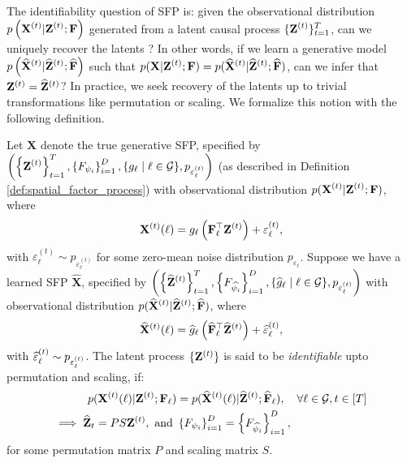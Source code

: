 The identifiability question of SFP is: given the observational distribution $\displaystyle p \left(\mathbf{X}^{(t)}|\mathbf{Z}^{(t)}; \mathbf{F}\right)$ generated from a latent causal process $\displaystyle \{ \mathbf{Z}^{(t)} \}_{t=1}^T$, can we uniquely recover the latents \citep{yao2021learning, yao2022temporally, moran2022identifiable}? In other words, if we learn a generative model $\displaystyle p\left( \widehat{\mathbf{X}}^{(t)} | \widehat{\mathbf{Z}}^{(t)};  \widehat{\mathbf{F}} \right)$ such that $\displaystyle p(\mathbf{X}|\mathbf{Z}^{(t)}; {\mathbf{F}}) = p(\widehat{\mathbf{X}}^{(t)}|\widehat{\mathbf{Z}}^{(t)}; \widehat{\mathbf{F}} )$, can we infer that $\mathbf{Z}^{(t)} = \widehat{\mathbf{Z}}^{(t)}$? In practice, we seek recovery of the latents up to trivial transformations like permutation or scaling.  We formalize this notion with the following definition.

\begin{definition}
  Let $\mathbf{X}$ denote the true generative SFP, specified by $\displaystyle \left(\left\{\mathbf{Z}^{(t)}\right\}_{t=1}^T, \left\{ F_{\psi_i} \right\}_{i=1}^D , \{ g_{\ell} \mid \ell \in \mathcal{G}\}, p_{\varepsilon_{\ell}^{(t)}} \right)$ (as described in Definition \ref{def:spatial_factor_process}) with observational distribution $\displaystyle p(\mathbf{X}^{(t)} | \mathbf{Z}^{(t)}; \mathbf{F})$, where 
  \begin{equation}
      \mathbf{X}^{(t)}(\ell) = g_{\ell} \left( \mathbf{F}_{\ell}^\top \mathbf{Z}^{(t)} \right) + \varepsilon_{\ell}^{(t)}, \label{eqn:xt1}
  \end{equation} 
  with $\varepsilon_{\ell}^{(t)} \sim p_{\varepsilon_{\ell}^{(t)}}$ for some zero-mean noise distribution $p_{\varepsilon_{\ell}}$. Suppose we have a learned SFP $\displaystyle \widehat{\mathbf{X}}$, specified by $\displaystyle \left(\left\{\widehat{\mathbf{Z}}^{(t)} \right\}_{t=1}^T, \left\{ F_{\widehat{\psi_i}} \right\}_{i=1}^D, \{ \widehat{g}_{\ell} \mid \ell \in \mathcal{G}\}, {p_{{\varepsilon}_{\ell}^{(t)}}} \right)$
  with observational distribution $\displaystyle p( \widehat{\mathbf{X}}^{(t)} | \widehat{\mathbf{Z}}^{(t)}; \widehat{\mathbf{F}})$, where
  \begin{equation}
  \displaystyle \widehat{\mathbf{X}}^{(t)}(\ell) = \widehat{g}_{\ell} \left( \widehat{\mathbf{F}}_{\ell}^\top \widehat{\mathbf{Z}}^{(t)} \right) + \widehat{\varepsilon}_{\ell}^{(t)}, \label{eqn:hatxt1}   
  \end{equation}
  with $\widehat{\varepsilon}_{\ell}^{(t)} \sim {p_{{\varepsilon}_{\ell}^{(t)}}}$. The latent process $\{\mathbf{Z}^{(t)}\}$ is said to be \textit{identifiable} upto permutation and scaling, if:
  \begin{align*}
    p(\mathbf{X}^{(t)}(\ell) | \mathbf{Z}^{(t)}; \mathbf{F}_{\ell}) &= p( \widehat{\mathbf{X}}^{(t)}(\ell) | \widehat{\mathbf{Z}}^{(t)}; \widehat{\mathbf{F}}_{\ell}), \quad \forall \ell \in \mathcal{G}, t \in [T] \\
    \implies \widehat{\mathbf{Z}}_t = PS \mathbf{Z}^{(t)}, \text{ and }& \left\{ F_{\psi_i}\right\}_{i=1}^D = \left\{ F_{\widehat{\psi_i}}\right\}_{i=1}^D,
  \end{align*}
  for some permutation matrix $P$ and scaling matrix $S$.
\end{definition}

